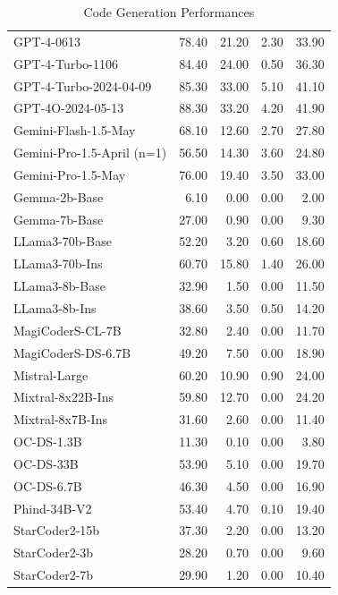 \begin{table}[ht]
\begin{tabular}{lrrrr}
GPT-4-0613 & 78.40& 21.20& 2.30& 33.90\\
GPT-4-Turbo-1106 & 84.40& 24.00& 0.50& 36.30\\
GPT-4-Turbo-2024-04-09 & 85.30& 33.00& 5.10& 41.10\\
GPT-4O-2024-05-13 & 88.30& 33.20& 4.20& 41.90\\
Gemini-Flash-1.5-May & 68.10& 12.60& 2.70& 27.80\\
Gemini-Pro-1.5-April (n=1) & 56.50& 14.30& 3.60& 24.80\\
Gemini-Pro-1.5-May & 76.00& 19.40& 3.50& 33.00\\
Gemma-2b-Base & 6.10& 0.00& 0.00& 2.00\\
Gemma-7b-Base & 27.00& 0.90& 0.00& 9.30\\
LLama3-70b-Base & 52.20& 3.20& 0.60& 18.60\\
LLama3-70b-Ins & 60.70& 15.80& 1.40& 26.00\\
LLama3-8b-Base & 32.90& 1.50& 0.00& 11.50\\
LLama3-8b-Ins & 38.60& 3.50& 0.50& 14.20\\
MagiCoderS-CL-7B & 32.80& 2.40& 0.00& 11.70\\
MagiCoderS-DS-6.7B & 49.20& 7.50& 0.00& 18.90\\
Mistral-Large & 60.20& 10.90& 0.90& 24.00\\
Mixtral-8x22B-Ins & 59.80& 12.70& 0.00& 24.20\\
Mixtral-8x7B-Ins & 31.60& 2.60& 0.00& 11.40\\
OC-DS-1.3B & 11.30& 0.10& 0.00& 3.80\\
OC-DS-33B & 53.90& 5.10& 0.00& 19.70\\
OC-DS-6.7B & 46.30& 4.50& 0.00& 16.90\\
Phind-34B-V2 & 53.40& 4.70& 0.10& 19.40\\
StarCoder2-15b & 37.30& 2.20& 0.00& 13.20\\
StarCoder2-3b & 28.20& 0.70& 0.00& 9.60\\
StarCoder2-7b & 29.90& 1.20& 0.00& 10.40\\
    \hline
    \end{tabular}
\caption{Code Generation Performances}
\end{table}

